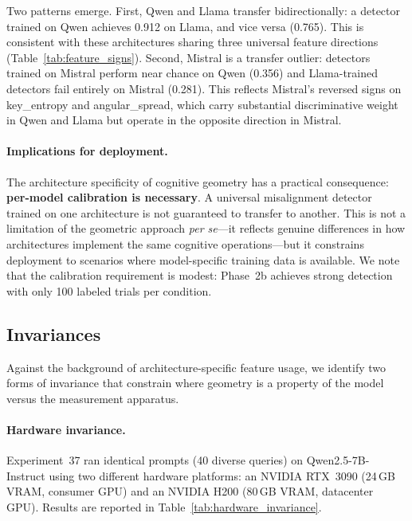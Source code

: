 \noindent Two patterns emerge.
First, Qwen and Llama transfer bidirectionally: a detector trained on Qwen achieves 0.912 on Llama, and vice versa (0.765).
This is consistent with these architectures sharing three universal feature directions (Table~\ref{tab:feature_signs}).
Second, Mistral is a transfer outlier: detectors trained on Mistral perform near chance on Qwen (0.356) and Llama-trained detectors fail entirely on Mistral (0.281).
This reflects Mistral's reversed signs on key\_entropy and angular\_spread, which carry substantial discriminative weight in Qwen and Llama but operate in the opposite direction in Mistral.

\paragraph{Implications for deployment.}
The architecture specificity of cognitive geometry has a practical consequence: \textbf{per-model calibration is necessary}.
A universal misalignment detector trained on one architecture is not guaranteed to transfer to another.
This is not a limitation of the geometric approach \emph{per se}---it reflects genuine differences in how architectures implement the same cognitive operations---but it constrains deployment to scenarios where model-specific training data is available.
We note that the calibration requirement is modest: Phase~2b achieves strong detection with only 100 labeled trials per condition.

\subsection{Invariances}
\label{sec:invariances}

Against the background of architecture-specific feature usage, we identify two forms of invariance that constrain where \kvcache geometry is a property of the model versus the measurement apparatus.

\paragraph{Hardware invariance.}
Experiment~37 ran identical prompts (40 diverse queries) on Qwen2.5-7B-Instruct using two different hardware platforms: an NVIDIA RTX~3090 (24\,GB VRAM, consumer GPU) and an NVIDIA H200 (80\,GB VRAM, datacenter GPU).
Results are reported in Table~\ref{tab:hardware_invariance}.

